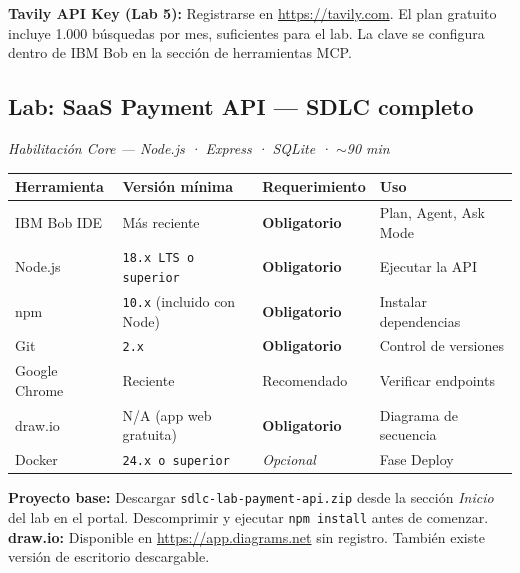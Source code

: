\documentclass[11pt, a4paper]{article}
\newcommand{\version}[1]{\texttt{\textcolor{ibmblue}{#1}}}
\newcommand{\cmd}[1]{\texttt{\textcolor{ibmdark}{\small #1}}}
\newcommand{\req}[1]{\textbf{\textcolor{ibmred}{#1}}}
\newcommand{\optional}[1]{\textit{\textcolor{ibmgray}{#1}}}
\begin{document}
\vspace{10pt}
\begin{infobox}
  \textbf{Tavily API Key (Lab 5):} Registrarse en \url{https://tavily.com}. El plan gratuito incluye 1.000 búsquedas por mes, suficientes para el lab. La clave se configura dentro de IBM Bob en la sección de herramientas MCP.
\end{infobox}

\subsection{Lab: SaaS Payment API — SDLC completo}
\label{sec:sdlc}

\textit{Habilitación Core — Node.js · Express · SQLite · $\sim$90 min}

\vspace{4pt}
\begin{tabular}{@{}llll@{}}
\toprule
\textbf{Herramienta} & \textbf{Versión mínima} & \textbf{Requerimiento} & \textbf{Uso} \\
\midrule
IBM Bob IDE & Más reciente & \req{Obligatorio} & Plan, Agent, Ask Mode \\
Node.js & \version{18.x LTS o superior} & \req{Obligatorio} & Ejecutar la API \\
npm & \version{10.x} (incluido con Node) & \req{Obligatorio} & Instalar dependencias \\
Git & \version{2.x} & \req{Obligatorio} & Control de versiones \\
Google Chrome & Reciente & Recomendado & Verificar endpoints \\
draw.io & N/A (app web gratuita) & \req{Obligatorio} & Diagrama de secuencia \\
Docker & \version{24.x o superior} & \optional{Opcional} & Fase Deploy \\
\bottomrule
\end{tabular}

\vspace{10pt}
\begin{infobox}
  \textbf{Proyecto base:} Descargar \texttt{sdlc-lab-payment-api.zip} desde la sección \emph{Inicio} del lab en el portal. Descomprimir y ejecutar \cmd{npm install} antes de comenzar. \\[4pt]
  \textbf{draw.io:} Disponible en \url{https://app.diagrams.net} sin registro. También existe versión de escritorio descargable.
\end{infobox}
\end{document}
